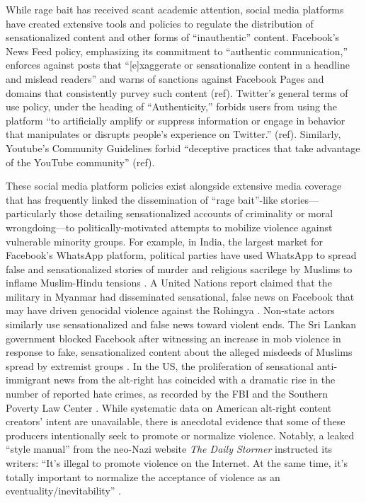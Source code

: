 \documentclass[12pt, letterpaper]{article}
\begin{document}
While rage bait has received scant academic attention, social media platforms have created extensive tools and policies to regulate the distribution of sensationalized content and other forms of ``inauthentic'' content. Facebook's News Feed policy, emphasizing its commitment to ``authentic communication,'' enforces against posts that ``[e]xaggerate or sensationalize content in a headline and mislead readers'' and warns of sanctions against Facebook Pages and domains that consistently purvey such content (ref). Twitter's general terms of use policy, under the heading of ``Authenticity,'' forbids users from using the platform ``to artificially amplify or suppress information or engage in behavior that manipulates or disrupts people’s experience on Twitter.'' (ref). Similarly, Youtube's Community Guidelines forbid ``deceptive practices that take advantage of the YouTube community'' (ref). 

These social media platform policies exist alongside extensive media coverage that has frequently linked the dissemination of ``rage bait''-like stories---particularly those detailing sensationalized accounts of criminality or moral wrongdoing---to politically-motivated attempts to mobilize violence against vulnerable minority groups. For example, in India, the largest market for Facebook's WhatsApp platform, political parties have used WhatsApp to spread false and sensationalized stories of murder and religious sacrilege by Muslims to inflame Muslim-Hindu tensions \citep{parth2018}. A United Nations report claimed that the military in Myanmar had disseminated sensational, false news on Facebook that may have driven genocidal violence against the Rohingya \citep{mozur2018}. Non-state actors similarly use sensationalized and false news toward violent ends. The Sri Lankan government blocked Facebook after witnessing an increase in mob violence in response to fake, sensationalized content about the alleged misdeeds of Muslims spread by extremist groups \citep{goel2018b}. In the US, the proliferation of sensational anti-immigrant news from the alt-right has coincided with a dramatic rise in the number of reported hate crimes, as recorded by the FBI and the Southern Poverty Law Center \citep{barrett_2018}. While systematic data on American alt-right content creators' intent are unavailable, there is anecdotal evidence that some of these producers intentionally seek to promote or normalize violence. Notably, a leaked ``style manual'' from the neo-Nazi website \textit{The Daily Stormer} instructed its writers: ``It's illegal to promote violence on the Internet. At the same time, it’s totally important to normalize the acceptance of violence as an eventuality/inevitability'' \citep{feinberg2017daily}. 
\end{document}
